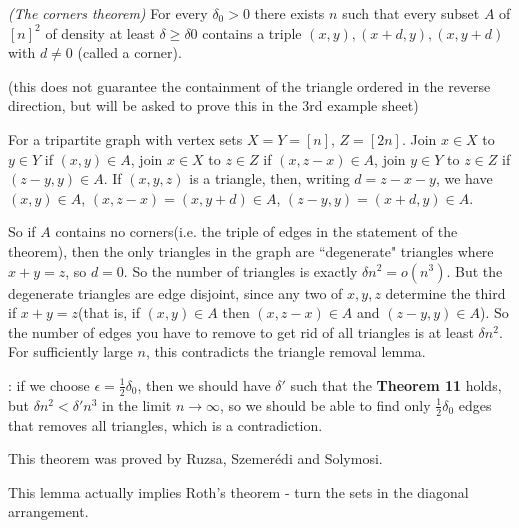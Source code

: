 \documentclass[12pt,a4paper]{report}
\newenvironment{proof}
{\begin{changemargin}{1cm}{0.5cm}
	}%
	{\end{changemargin}
}
\newenvironment{subproof}
{\begin{changemargin}{0.5cm}{0.5cm}
	}%
	{\end{changemargin}
}
\begin{document}
 \emph{(The corners theorem)} For every $\delta_0 >0$ there exists $n$ such that every subset $A$ of $[n]^2$ of density at least $\delta \geq \delta0$ contains a triple $(x,y),(x+d,y),(x,y+d)$ with $d\neq 0$ (called a corner).

(this does not guarantee the containment of the triangle ordered in the reverse direction, but will be asked to prove this in the 3rd example sheet)
\begin{proof}
\pf For a tripartite graph with vertex sets $X=Y=[n]$, $Z=[2n]$. Join $x\in X$ to $y\in Y$ if $(x,y) \in A$, join $x\in X$ to $z\in Z$ if $(x,z-x) \in A$, join $y\in Y$ to $z\in Z$ if $(z-y,y) \in A$. If $(x,y,z)$ is a triangle, then, writing $d = z-x-y$, we have $(x,y)\in A$, $(x,z-x)=(x,y+d)\in A$, $(z-y,y) = (x+d,y) \in A$.

\quad So if $A$ contains no corners(i.e. the triple of edges in the statement of the theorem), then the only triangles in the graph are ``degenerate" triangles where $x+y=z$, so $d=0$. So the number of triangles is exactly $\delta n^2 = o(n^3)$. But the degenerate triangles are edge disjoint, since any two of $x,y,z$ determine the third if $x+y =z$(that is, if $(x,y)\in A$ then $(x,z-x) \in A$ and $(z-y,y) \in A$). So the number of edges you have to remove to get rid of all triangles is at least $\delta n^2$. For sufficiently large $n$, this contradicts the triangle removal lemma.
\begin{subproof}
: if we choose $\epsilon = \frac{1}{2} \delta_0$, then we should have $\delta'$ such that the \textbf{Theorem 11} holds, but $\delta n^2 < \delta' n^3$ in the limit $n\rightarrow \infty$, so we should be able to find only $\frac{1}{2} \delta_0$ edges that removes all triangles, which is a contradiction.
\end{subproof}
\eop

This theorem was proved by Ruzsa, Szemer\'{e}di and Solymosi.
\end{proof}
\s

This lemma actually implies Roth's theorem - turn the sets in the diagonal arrangement.
\s
\end{document}
